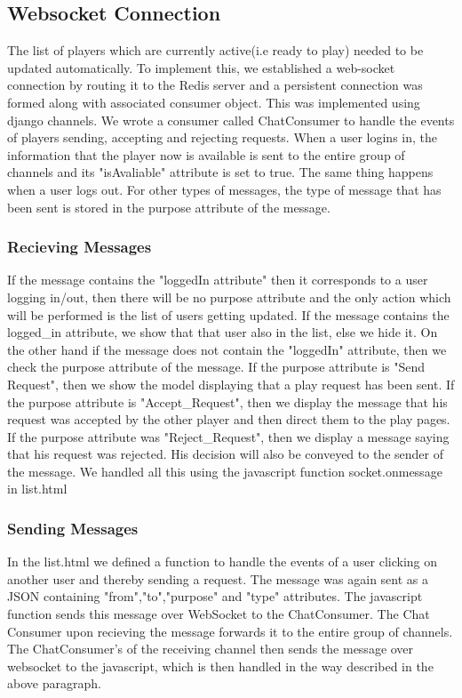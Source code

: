 \documentclass[titlepage]{article}
\begin{document}
\subsection{Websocket Connection}
The list of players which are currently active(i.e ready to play) needed to be updated automatically. To implement this, we established a web-socket connection by routing it to the Redis server and a persistent connection was formed along with associated consumer object. This was implemented using django channels. We wrote a consumer called ChatConsumer to handle the events of players sending, accepting and rejecting requests. When a user logins in, the information that the player now is available is sent to the entire group of channels and its "isAvaliable" attribute is set to true. The same thing happens when a user logs out. For other types of messages, the type of message that has been sent is stored in the purpose attribute of the message.
\subsubsection{Recieving Messages}
If the message contains the "loggedIn attribute" then it corresponds to a user logging in/out, then there will be no purpose attribute and the only action which will be performed is the list of users getting updated. If the message contains the logged\_in attribute, we show that that user also in the list, else we hide it.  On the other hand if the message does not contain the "loggedIn" attribute, then we check the purpose attribute of the message. If the purpose attribute is "Send Request", then we show the model displaying that a play request has been sent. If the purpose attribute is "Accept\_Request", then we display the message that his request was accepted by the other player and then direct them to the play pages. If the purpose attribute was "Reject\_Request", then we display a message saying that his request was rejected.  His decision will also be conveyed to the sender of the message. We handled all this using the javascript function socket.onmessage in list.html

\subsubsection{Sending Messages}
In the list.html we defined a function to handle the events of a user clicking on another user and thereby sending a request. The message was again sent as a JSON containing "from","to","purpose" and "type" attributes. The javascript function sends this message over WebSocket to the ChatConsumer. The Chat Consumer upon recieving the message forwards it to the entire group of channels. The ChatConsumer's of the receiving channel then sends the message over websocket to the javascript, which is then handled in the way described in the above paragraph.
\end{document}
